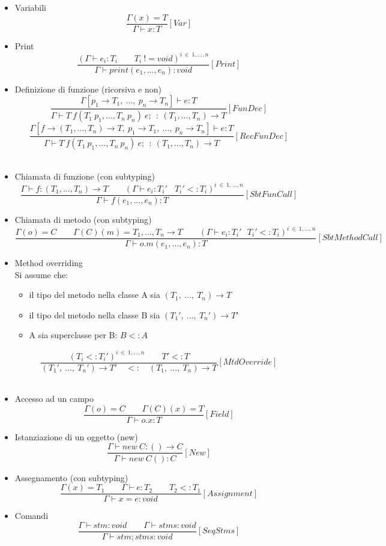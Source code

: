 \documentclass[a4paper]{article}   %
\begin{document}
\begin{itemize}
  \item Variabili
  $$ \frac{\Gamma(x) = T}{\Gamma \vdash x : T}[Var]$$

  \item Print
  $$ \frac{(\Gamma \vdash e_i : T_i \qquad T_i\ != void)^{i\ \in\ 1, ...,n}}{\Gamma \vdash print(e_1,...,e_n) : void }[Print]$$
  
  \item Definizione di funzione (ricorsiva e non)
  $$ \frac{\Gamma [p_1 \rightarrow T_1, \ ..., \ p_n \rightarrow T_n] \vdash e : T}{\Gamma \vdash T \ f(T_1 \ p_1, ..., T_n \ p_n) \ e;\ \ : \ (T_1, ..., T_n) \rightarrow T}[FunDec]$$
  $$\frac{\Gamma [f \rightarrow (T_1, ..., T_n) \rightarrow T,\ p_1 \rightarrow T_1, \ ..., \ p_n \rightarrow T_n] \vdash e : T}{\Gamma \vdash T \ f(T_1 \ p_1, ..., T_n \ p_n) \ e;\ \ : \ (T_1, ..., T_n) \rightarrow T}[RecFunDec]$$\\

  \item Chiamata di funzione (con subtyping)
  $$ \frac{\Gamma \vdash f : (T_1, ..., T_n) \rightarrow T \qquad (\Gamma \vdash e_i : T_i' \  \ \ \ T_i' <: T_i )^{i\ \in\ 1, ...,n}}{\Gamma \vdash f(e_1,...,e_n) : T}[SbtFunCall] $$

  \item Chiamata di metodo (con subtyping)
  $$ \frac{\Gamma(o) = C \qquad \Gamma(C)(m) = T_1, ... , T_n \rightarrow T \qquad (\Gamma \vdash e_i : T_i' \ \ \ T_i' <: T_i)^{i\ \in\ 1, ...,n}}{\Gamma \vdash o.m(e_1,...,e_n) : T}[SbtMethodCall] $$
  
  \item Method overriding\\
  Si assume che:
  \begin{itemize}
  	\item il tipo del metodo nella classe A sia $(T_1,\ ...,\ T_n) \rightarrow T$
	\item il tipo del metodo nella classe B sia $(T_1',\ ...,\ T_n') \rightarrow T'$
	\item A sia superclasse per B: $B <: A$\\
  \end{itemize}
  $$ \frac{(T_i <: T_i')^{i\ \in\ 1,...,n} \qquad T' <: T}{(T_1',\ ...,\ T_n') \rightarrow T' \quad <: \quad (T_1,\ ...,\ T_n) \rightarrow T}[MtdOverride] $$\\

  \item Accesso ad un campo
  $$ \frac{\Gamma(o) = C \qquad \Gamma(C)(x) = T}{\Gamma \vdash o.x : T}[Field] $$

  \item Istanziazione di un oggetto (new)
  $$ \frac{\Gamma \vdash new \ C : () \rightarrow C}{\Gamma \vdash new \ C() : C}[New] $$

  \item Assegnamento (con subtyping)
  $$ \frac{\Gamma(x) = T_1 \qquad \Gamma \vdash e : T_2 \qquad T_2 <: T_1}{\Gamma \vdash x = e : void}[Assignment] $$

  \item Comandi
  $$ \frac{\Gamma \vdash stm : void \qquad \Gamma \vdash stms : void}{\Gamma \vdash stm ; stms : void}[SeqStms] $$
\end{itemize}
\end{document}

